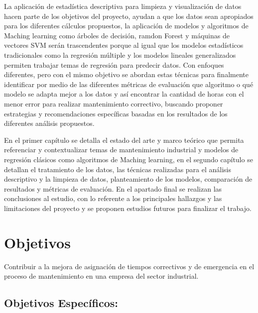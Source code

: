 \documentclass[
  11pt,
  bookmarksnumbered]{article}
\begin{document}
La aplicación de estadística descriptiva para limpieza y visualización de datos hacen parte de los objetivos del proyecto, ayudan a que los datos sean apropiados para los diferentes cálculos propuestos, la aplicación de modelos y algoritmos de Maching learning como árboles de decisión, ramdon Forest y máquinas de vectores SVM serán trascendentes porque al igual que los modelos estadísticos tradicionales como la regresión múltiple y los modelos lineales generalizados permiten trabajar temas de regresión para predecir datos.
Con enfoques diferentes, pero con el mismo objetivo se abordan estas técnicas para finalmente identificar por medio de las diferentes métricas de evaluación que algoritmo o qué modelo se adapta mejor a los datos y así encontrar la cantidad de horas con el menor error para realizar mantenimiento correctivo, buscando proponer estrategias y recomendaciones específicas basadas en los resultados de los diferentes análisis propuestos.

En el primer capítulo se detalla el estado del arte y marco teórico que permita referenciar y contextualizar temas de mantenimiento industrial y modelos de regresión clásicos como algoritmos de Maching learning, en el segundo capítulo se detallan el tratamiento de los datos, las técnicas realizadas para el análisis descriptivo y la limpieza de datos, planteamiento de los modelos, comparación de resultados y métricas de evaluación.
En el apartado final se realizan las conclusiones al estudio, con lo referente a los principales hallazgos y las limitaciones del proyecto y se proponen estudios futuros para finalizar el trabajo.

\newpage

\hypertarget{objetivos}{%
\section{Objetivos}\label{objetivos}}

Contribuir a la mejora de asignación de tiempos correctivos y de emergencia en el proceso de mantenimiento en una empresa del sector industrial.

\hypertarget{objetivos-especuxedficos}{%
\subsection{Objetivos Específicos:}\label{objetivos-especuxedficos}}
\end{document}
